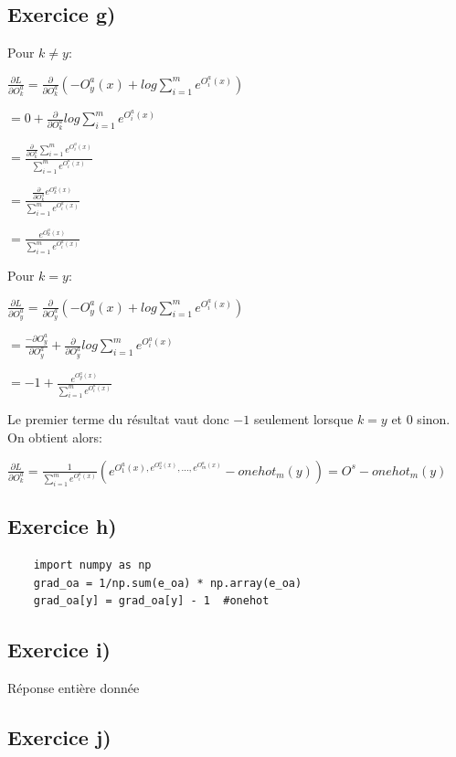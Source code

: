 \documentclass[a4paper,10pt]{article}
\begin{document}
\subsection{Exercice g)}
Pour $k \neq y$:

$\frac{\partial L}{\partial {O^a_k}} = \frac{\partial}{\partial O^a_k} ( -O^a_y (x)+ log \sum_{i=1}^{m} e^{O^a_i(x)})$

$= 0 + \frac{\partial}{\partial O^a_k} log \sum_{i=1}^{m} e^{O^a_i(x)}$

$= \frac{\frac{\partial}{\partial O^a_k} \sum_{i=1}^{m} e^{O^a_i(x)}}{\sum_{i=1}^{m} e^{O^a_i(x)}}$

$= \frac{\frac{\partial}{\partial O^a_k} e^{O^a_k(x)}}{\sum_{i=1}^{m} e^{O^a_i(x)}}$

$= \frac{e^{O^a_k(x)}}{\sum_{i=1}^{m} e^{O^a_i(x)}}$

Pour $k=y$:

$\frac{\partial L}{\partial {O^a_y}} = \frac{\partial}{\partial O^a_y} ( -O^a_y (x)+ log \sum_{i=1}^{m} e^{O^a_i(x)})$

$= \frac{-\partial O^a_y}{\partial O^a_y} + \frac{\partial}{\partial O^a_y} log \sum_{i=1}^{m} e^{O^a_i(x)}$

$= -1+\frac{e^{O^a_y(x)}}{\sum_{i=1}^{m} e^{O^a_i(x)}}$

Le premier terme du résultat vaut donc $-1$ seulement lorsque $k=y$ et 0 sinon. On obtient alors:

$\frac{\partial L}{\partial {O^a_k}} = \frac{1}{\sum_{i=1}^{m} e^{O^a_i(x)}} (e^{O^a_1(x), e^{O^a_2(x)}, ..., e^{O^a_m(x)}}- onehot_m(y)) = O^s - onehot_m(y)$

\subsection{Exercice h)}


\begin{verbatim}
	import numpy as np
	grad_oa = 1/np.sum(e_oa) * np.array(e_oa)
	grad_oa[y] = grad_oa[y] - 1  #onehot
\end{verbatim}

\subsection{Exercice i)}
Réponse entière donnée

\subsection{Exercice j)} 
\end{document}
